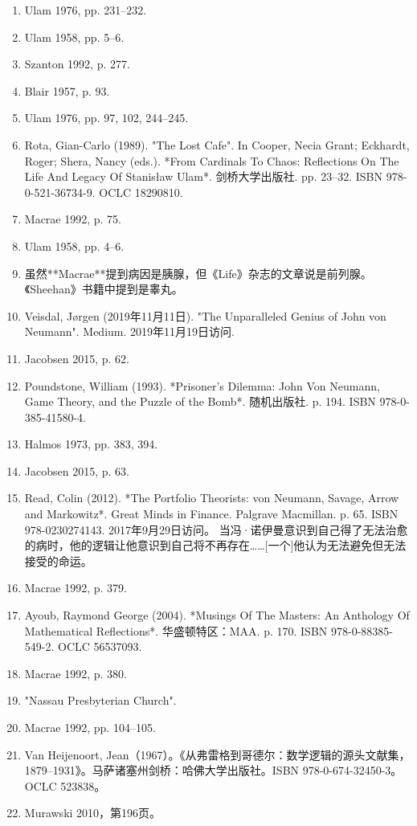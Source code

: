 \begin{enumerate}
\item Ulam 1976, pp. 231–232.  
\item Ulam 1958, pp. 5–6.  
\item Szanton 1992, p. 277.  
\item Blair 1957, p. 93.  
\item Ulam 1976, pp. 97, 102, 244–245.  
\item Rota, Gian-Carlo (1989). "The Lost Cafe". In Cooper, Necia Grant; Eckhardt, Roger; Shera, Nancy (eds.). *From Cardinals To Chaos: Reflections On The Life And Legacy Of Stanisław Ulam*. 剑桥大学出版社. pp. 23–32. ISBN 978-0-521-36734-9. OCLC 18290810.  
\item Macrae 1992, p. 75.  
\item Ulam 1958, pp. 4–6.  
\item 虽然**Macrae**提到病因是胰腺，但《Life》杂志的文章说是前列腺。《Sheehan》书籍中提到是睾丸。  
\item Veisdal, Jørgen (2019年11月11日). "The Unparalleled Genius of John von Neumann". Medium. 2019年11月19日访问.  
\item Jacobsen 2015, p. 62.  
\item Poundstone, William (1993). *Prisoner's Dilemma: John Von Neumann, Game Theory, and the Puzzle of the Bomb*. 随机出版社. p. 194. ISBN 978-0-385-41580-4.  
\item Halmos 1973, pp. 383, 394.  
\item Jacobsen 2015, p. 63.
\item Read, Colin (2012). *The Portfolio Theorists: von Neumann, Savage, Arrow and Markowitz*. Great Minds in Finance. Palgrave Macmillan. p. 65. ISBN 978-0230274143. 2017年9月29日访问。  
当冯·诺伊曼意识到自己得了无法治愈的病时，他的逻辑让他意识到自己将不再存在……[一个]他认为无法避免但无法接受的命运。  
\item Macrae 1992, p. 379.
\item Ayoub, Raymond George (2004). *Musings Of The Masters: An Anthology Of Mathematical Reflections*. 华盛顿特区：MAA. p. 170. ISBN 978-0-88385-549-2. OCLC 56537093.  
\item Macrae 1992, p. 380.
\item "Nassau Presbyterian Church".  
\item Macrae 1992, pp. 104–105.
\item Van Heijenoort, Jean（1967）。《从弗雷格到哥德尔：数学逻辑的源头文献集，1879–1931》。马萨诸塞州剑桥：哈佛大学出版社。ISBN 978-0-674-32450-3。OCLC 523838。  
\item Murawski 2010，第196页。  

\end{enumerate}
